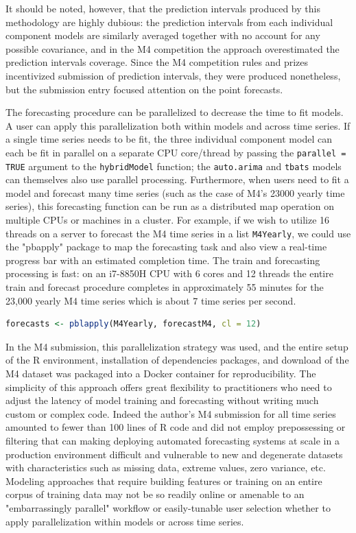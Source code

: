 \documentclass[11pt,3p,review,authoryear]{elsarticle}
\begin{document}
It should be noted, however, that the prediction intervals produced by this methodology are highly dubious: the prediction intervals from each individual component models are similarly averaged together with no account for any possible covariance, and in the M4 competition the approach overestimated the prediction intervals coverage. Since the M4 competition rules and prizes incentivized submission of prediction intervals, they were produced nonetheless, but the submission entry focused attention on the point forecasts.


The forecasting procedure can be parallelized to decrease the time to fit models. A user can apply this parallelization both within models and across time series. If a single time series needs to be fit, the three individual component model can each be fit in parallel on a separate CPU core/thread by passing the \texttt{parallel = TRUE} argument to the \texttt{hybridModel} function; the \texttt{auto.arima} and \texttt{tbats} models can themselves also use parallel processing. Furthermore, when users need to fit a model and forecast many time series (such as the case of M4's 23000 yearly time series), this forecasting function can be run as a distributed map operation on multiple CPUs or machines in a cluster. For example, if we wish to utilize 16 threads on a server to forecast the M4 time series in a list \texttt{M4Yearly}, we could use the "pbapply" package \citep{pbapply} to map the forecasting task and also view a real-time progress bar with an estimated completion time. The train and forecasting processing is fast: on an i7-8850H CPU with 6 cores and 12 threads the entire train and forecast procedure completes in approximately 55 minutes for the 23,000 yearly M4 time series which is about 7 time series per second.

\begin{lstlisting}[language=R]
forecasts <- pblapply(M4Yearly, forecastM4, cl = 12)
\end{lstlisting}


In the M4 submission, this parallelization strategy was used, and the entire setup of the R environment, installation of dependencies packages, and download of the M4 dataset was packaged into a Docker container for reproducibility. The simplicity of this approach offers great flexibility to practitioners who need to adjust the latency of model training and forecasting without writing much custom or complex code. Indeed the author's M4 submission for all time series amounted to fewer than 100 lines of R code and did not employ prepossessing or filtering that can making deploying automated forecasting systems at scale in a production environment difficult and vulnerable to new and degenerate datasets with characteristics such as missing data, extreme values, zero variance, etc. Modeling approaches that require building features or training on an entire corpus of training data may not be so readily online or amenable to an "embarrassingly parallel" workflow or easily-tunable user selection whether to apply parallelization within models or across time series.
\end{document}
